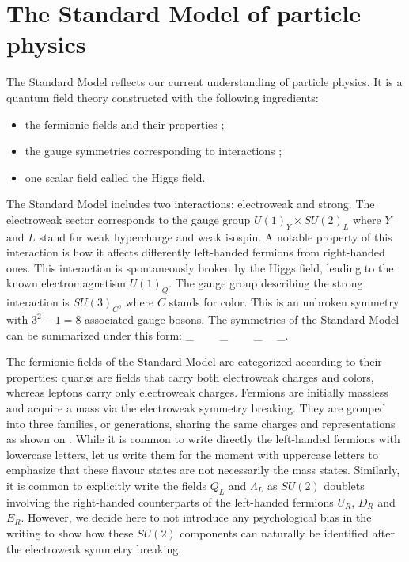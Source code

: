     \section{The Standard Model of particle physics \label{sec:standardModel}}

    The Standard Model \cite{Glashow, Weinberg} reflects our current
    understanding of particle physics. It is a quantum field theory constructed
    with the following ingredients:
    \begin{itemize}
        \item the fermionic fields and their properties ;
        \item the gauge symmetries corresponding to interactions ;
        \item one scalar field called the Higgs field.
    \end{itemize}

    The Standard Model includes two interactions: electroweak and strong. The
    electroweak sector corresponds to the gauge group $U(1)_Y \times SU(2)_L$
    where $Y$ and $L$ stand for weak hypercharge and weak isospin. A notable
    property of this interaction is how it affects differently left-handed
    fermions from right-handed ones. This interaction is spontaneously broken by
    the Higgs field, leading to the known electromagnetism $U(1)_Q$. The gauge
    group describing the strong interaction is $SU(3)_C$, where $C$ stands for
    color. This is an unbroken symmetry with $3^2-1 = 8$ associated gauge
    bosons.  The symmetries of the Standard Model can be summarized under this
    form:
    {
        _{}
        \,\,\,\,
        \times
        \,\,\,\,
        _{}
        \,\,\,\,
        \,\,\,\,
        _{}
        \,\,\,\,
        \times
        _{}.
    }

    The fermionic fields of the Standard Model are categorized according to
    their properties: quarks are fields that carry both electroweak charges and
    colors, whereas leptons carry only electroweak charges. Fermions are
    initially massless and acquire a mass via the electroweak symmetry breaking.
    They are grouped into three families, or generations, sharing the same
    charges and representations as shown on .
    While it is common to write directly the left-handed fermions with lowercase
    letters, let us write them for the moment with uppercase letters to
    emphasize that these flavour states are not necessarily the mass states.
    Similarly, it is common to explicitly write the fields $Q_L$ and $\Lambda_L$
    as $SU(2)$ doublets involving the right-handed counterparts of the
    left-handed fermions $U_R$, $D_R$ and $E_R$. However, we decide here to not
    introduce any psychological bias in the writing to show how these $SU(2)$
    components can naturally be identified after the electroweak symmetry
    breaking.

